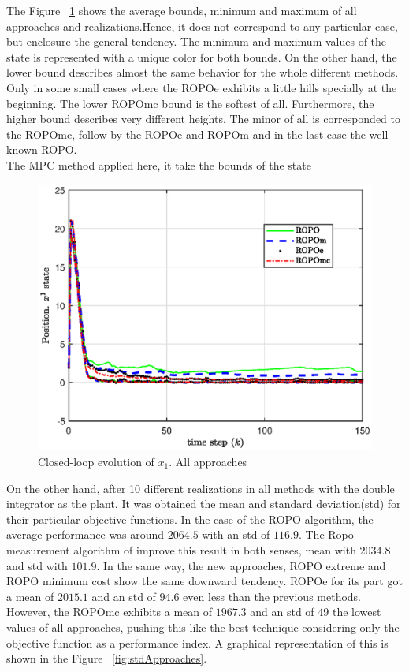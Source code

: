 \documentclass{ifacconf}
\begin{document}
The Figure ~\ref{fig:Allx1} shows the average bounds, minimum and maximum of all approaches and realizations.Hence, it does not correspond to any particular case, but enclosure the general tendency. The minimum and maximum values of the state is represented with a unique color for both bounds. On the other hand, the lower bound describes almost the same behavior for the whole different methods. Only in some small cases where the ROPOe exhibits a little hills specially at the beginning. The lower ROPOmc bound is the softest of all.
Furthermore, the higher bound describes very different heights. The minor of all is corresponded to the ROPOmc, follow by the ROPOe and ROPOm and in the last case the well-known ROPO.\\
The MPC method applied here, it take the bounds of the state\\
\begin{figure}
  \centering
  \includegraphics[width=0.95\linewidth]{x1150}
  \caption{Closed-loop evolution of $x_{1}$. All approaches}
  \label{fig:Allx1}
\end{figure}
On the other hand, after 10 different realizations in all methods with the double integrator as the plant. It was obtained the mean and standard deviation(std) for their particular objective functions. In the case of the ROPO algorithm, the average performance was around $2064.5$ with an std of $116.9$. The Ropo measurement algorithm of \citep{udit2018} improve this result in both senses, mean with $2034.8$ and std with $101.9$. In the same way, the new approaches, ROPO extreme and ROPO minimum cost show the same downward tendency. ROPOe for its part got a mean of $2015.1$ and an std of $94.6$ even less than the previous methods. However, the ROPOmc exhibits a mean of $1967.3$ and an std of $49$ the lowest values of all approaches, pushing this like the best technique considering only the objective function as a performance index. A graphical representation of this is shown in the Figure ~\ref{fig:stdApproaches}.
\end{document}
